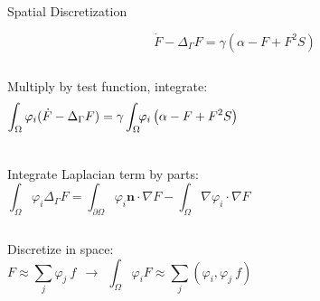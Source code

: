 \documentclass{beamer}
\begin{document}
            \begin{frame}{Spatial Discretization}
            
                {\Large $$\dot{F} - \Delta_\Gamma F=                    \gamma\left(\alpha - F + F^2S\right)$$}
                
                
                
                \begin{columns}
                        Multiply by test function, integrate:
                        $$ \int_\Omega\varphi_i(\dot{F}-\Delta_\Gamma F)=
                        \gamma\int_\Omega \frac{}{}\hspace{-2mm} \varphi_i\left(\alpha - F + F^2S\right) $$
                \end{columns}
                
                
                \vspace{5mm}
                
                \begin{columns}
                        Integrate Laplacian term by parts:
                        $$ \int_\Omega \varphi_i \Delta_\Gamma F = \int_{\partial\Omega} \varphi_i\textbf{n} \cdot \nabla F - \int_\Omega \nabla\varphi_i \cdot \nabla F $$
                \end{columns}
                
                
                \vspace{5mm}
                
                \begin{columns}
                        Discretize in space:
                        $$ F \approx \sum_j \varphi_j ~f ~~ \longrightarrow ~~ \int_\Omega \varphi_i F \approx \sum_j(\varphi_i, \varphi_j ~f) $$
                \end{columns}

                
            \end{frame}
            
            
            
            
            
\end{document}
